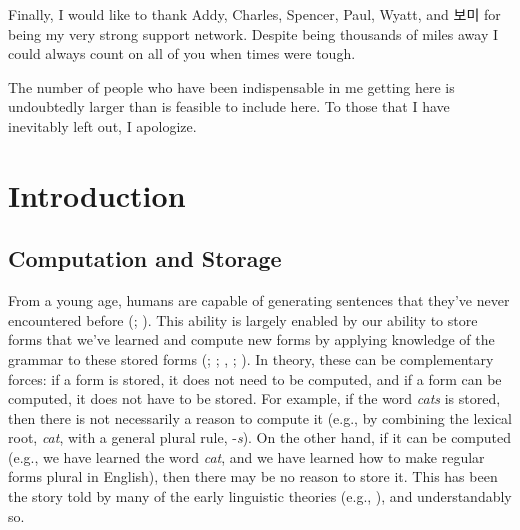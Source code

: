 \documentclass[
  letterpaper,
  DIV=11,
  numbers=noendperiod,
  nottoc,
  oneside]{scrreprt}
\begin{document}
Finally, I would like to thank Addy, Charles, Spencer, Paul, Wyatt, and
보미 for being my very strong support network. Despite being thousands
of miles away I could always count on all of you when times were tough.

The number of people who have been indispensable in me getting here is
undoubtedly larger than is feasible to include here. To those that I
have inevitably left out, I apologize.


\chapter{Introduction}\label{introduction}


\section{Computation and Storage}\label{computation-and-storage}

From a young age, humans are capable of generating sentences that
they've never encountered before
(;
). This ability
is largely enabled by our ability to store forms that we've learned and
compute new forms by applying knowledge of the grammar to these stored
forms (;
;
,
;
). In theory,
these can be complementary forces: if a form is stored, it does not need
to be computed, and if a form can be computed, it does not have to be
stored. For example, if the word \emph{cats} is stored, then there is
not necessarily a reason to compute it (e.g., by combining the lexical
root, \emph{cat}, with a general plural rule, -\emph{s}). On the other
hand, if it can be computed (e.g., we have learned the word \emph{cat},
and we have learned how to make regular forms plural in English), then
there may be no reason to store it. This has been the story told by many
of the early linguistic theories (e.g.,
), and understandably so.
\end{document}
